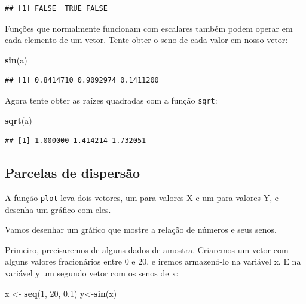 \documentclass[
]{book}
\newenvironment{Shaded}{\begin{snugshade}}{\end{snugshade}}
\newcommand{\DecValTok}[1]{\textcolor[rgb]{0.00,0.00,0.81}{#1}}
\newcommand{\FloatTok}[1]{\textcolor[rgb]{0.00,0.00,0.81}{#1}}
\newcommand{\KeywordTok}[1]{\textcolor[rgb]{0.13,0.29,0.53}{\textbf{#1}}}
\newcommand{\NormalTok}[1]{#1}
\newcommand{\StringTok}[1]{\textcolor[rgb]{0.31,0.60,0.02}{#1}}
\begin{document}
\begin{verbatim}
## [1] FALSE  TRUE FALSE
\end{verbatim}

Funções que normalmente funcionam com escalares também podem operar em cada elemento de um vetor. Tente obter o seno de cada valor em nosso vetor:

\begin{Shaded}
\begin{Highlighting}[]
\KeywordTok{sin}\NormalTok{(a)}
\end{Highlighting}
\end{Shaded}

\begin{verbatim}
## [1] 0.8414710 0.9092974 0.1411200
\end{verbatim}

Agora tente obter as raízes quadradas com a função \texttt{sqrt}:

\begin{Shaded}
\begin{Highlighting}[]
\KeywordTok{sqrt}\NormalTok{(a)}
\end{Highlighting}
\end{Shaded}

\begin{verbatim}
## [1] 1.000000 1.414214 1.732051
\end{verbatim}

\hypertarget{parcelas-de-dispersuxe3o}{%
\subsection{Parcelas de dispersão}\label{parcelas-de-dispersuxe3o}}

A função \texttt{plot} leva dois vetores, um para valores X e um para valores Y, e desenha um gráfico com eles.

Vamos desenhar um gráfico que mostre a relação de números e seus senos.

Primeiro, precisaremos de alguns dados de amostra. Criaremos um vetor com alguns valores fracionários entre 0 e 20, e iremos armazenó-lo na variável x. E na variável y um segundo vetor com os senos de x:

\begin{Shaded}
\begin{Highlighting}[]
\NormalTok{x <-}\StringTok{ }\KeywordTok{seq}\NormalTok{(}\DecValTok{1}\NormalTok{, }\DecValTok{20}\NormalTok{, }\FloatTok{0.1}\NormalTok{)}
\NormalTok{y<-}\KeywordTok{sin}\NormalTok{(x)}
\end{Highlighting}
\end{Shaded}
\end{document}
